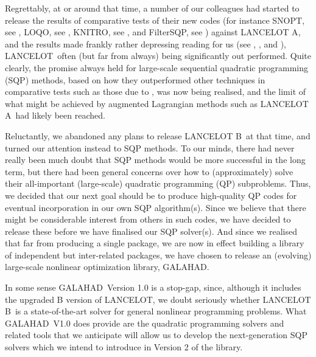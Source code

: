 \documentclass[twoside]{article}
\newcommand{\gal}{{\sf GALAHAD}}
\newcommand{\lan}{{\sf LANCELOT}}
\newcommand{\lana}{{\sf LANCELOT A}}
\newcommand{\lanb}{{\sf LANCELOT B}}
\begin{document}
Regrettably, at or around that time, a number of our colleagues
had started to release the results of comparative tests of their
new codes (for instance SNOPT, see ,
LOQO, see ,
KNITRO, see , and
FilterSQP, see ) against \lana,
and the results made frankly rather depressing reading for us
(see , , and ), \lan\
often (but far from always) being significantly out performed.
Quite clearly, the promise always held for large-scale
sequential quadratic programming (SQP) methods,
based on how they outperformed other techniques in comparative tests
such as those due to \cite{HockSchi81}, was now being realised, and the
limit of what might be achieved by augmented Lagrangian methods
such as \lana\ had likely been reached.

Reluctantly, we abandoned any plans to release \lanb\ at that time, and turned
our attention instead to SQP methods. To our minds, there had never
really been much doubt that SQP methods would be more successful in the
long term, but there had been  general concerns over
how to (approximately) solve their all-important (large-scale) quadratic
programming (QP) subproblems. Thus, we decided that our next goal
should be to produce high-quality QP codes for eventual incorporation
in our own SQP algorithm(s). Since we believe that there might
be considerable interest from others in such codes, we have decided to release
these before we have finalised our SQP solver(s). And since we realised that
far from producing a single package, we are now in effect building a
library of independent but inter-related packages, we have chosen to
release an (evolving) large-scale nonlinear optimization library, \gal.

In some sense \gal\ Version 1.0 is a stop-gap, since, although
it includes the upgraded B version of \lan, we doubt seriously whether
\lanb\ is a state-of-the-art solver for general nonlinear programming
problems. What \gal\ V1.0 does provide are the quadratic programming solvers
and related tools that we anticipate will allow us to develop the
next-generation SQP solvers
which we intend to introduce in Version 2 of the library.


\end{document}
